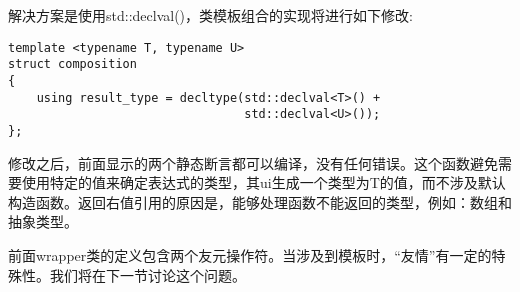 解决方案是使用std::declval()，类模板组合的实现将进行如下修改:

\begin{lstlisting}[style=styleCXX]
template <typename T, typename U>
struct composition
{
	using result_type = decltype(std::declval<T>() +
								 std::declval<U>());
};
\end{lstlisting}

修改之后，前面显示的两个静态断言都可以编译，没有任何错误。这个函数避免需要使用特定的值来确定表达式的类型，其ui生成一个类型为T的值，而不涉及默认构造函数。返回右值引用的原因是，能够处理函数不能返回的类型，例如：数组和抽象类型。

前面wrapper类的定义包含两个友元操作符。当涉及到模板时，“友情”有一定的特殊性。我们将在下一节讨论这个问题。

















